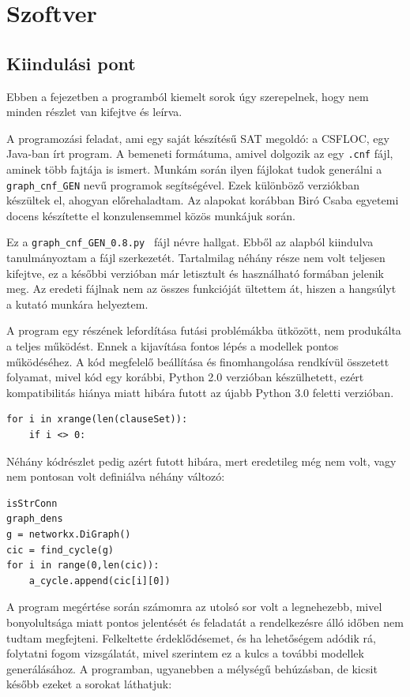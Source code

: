 \documentclass[
]{thesis-ekf}
\theoremstyle{definition}
\theoremstyle{remark}
\begin{document}
\chapter{Szoftver}
	\section{Kiindulási pont}
	Ebben a fejezetben a programból kiemelt sorok úgy szerepelnek, hogy nem minden részlet van kifejtve és leírva.
	
	A programozási feladat, ami egy saját készítésű \textsc{SAT} megoldó: a \textsc{CSFLOC}, egy Java-ban írt program. A bemeneti formátuma, amivel dolgozik az egy \texttt{.cnf} fájl, aminek több fajtája is ismert. Munkám során ilyen fájlokat tudok generálni a \texttt{graph\_cnf\_GEN} nevű programok segítségével. Ezek különböző verziókban készültek el, ahogyan előrehaladtam. Az alapokat korábban Biró Csaba egyetemi docens készítette el konzulensemmel közös munkájuk során.
	
	Ez a \texttt{graph\_cnf\_GEN\_0.8.py}~\cite{github-py08} fájl névre hallgat. Ebből az alapból kiindulva tanulmányoztam a fájl szerkezetét. Tartalmilag néhány része nem volt teljesen kifejtve, ez a későbbi verzióban már letisztult és használható formában jelenik meg. Az eredeti fájlnak nem az összes funkcióját ültettem át, hiszen a hangsúlyt a kutató munkára helyeztem.
	
	A program egy részének lefordítása futási problémákba ütközött, nem produkálta a teljes működést. Ennek a kijavítása fontos lépés a modellek pontos működéséhez. A kód megfelelő beállítása és finomhangolása rendkívül összetett folyamat, mivel  kód egy korábbi, Python 2.0 verzióban készülhetett, ezért kompatibilitás hiánya miatt hibára futott az újabb Python 3.0 feletti verzióban.
	
	\begin{lstlisting}
for i in xrange(len(clauseSet)):
	if i <> 0:
	\end{lstlisting}

	Néhány kódrészlet pedig azért futott hibára, mert eredetileg még nem volt, vagy nem pontosan volt definiálva néhány változó:
	
	\begin{lstlisting}
isStrConn
graph_dens
g = networkx.DiGraph()
cic = find_cycle(g)
for i in range(0,len(cic)):
	a_cycle.append(cic[i][0])
	\end{lstlisting}

	A program megértése során számomra az utolsó sor volt a legnehezebb, mivel bonyolultsága miatt pontos jelentését és feladatát a rendelkezésre álló időben nem tudtam megfejteni. Felkeltette érdeklődésemet, és ha lehetőségem adódik rá, folytatni fogom vizsgálatát, mivel szerintem ez a kulcs a további modellek generálásához. A programban, ugyanebben a mélységű behúzásban, de kicsit később ezeket a sorokat láthatjuk:
	
\end{document}
